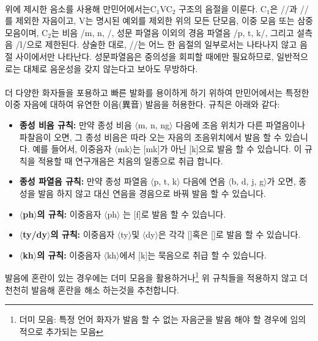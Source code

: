 \documentclass{book}
\begin{document}
    \paragraph{}
    위에 제시한 음소를 사용해 만민어에서는C$_1$VC$_2$ 구조의 음절을 이룬다. C$_1$은 //과 //를 제외한 자음이고, V는 명시된 예외를 제외한 위의 모든 단모음, 이중 모음 또는 삼중 모음이며, C$_2$는 비음 /m, n, /, 성문 파열음 이외의 경음 파열음 /p, t, k/, 그리고 설측음 /l/으로 제한된다. 상술한 대로, //는 어느 한 음절의 일부로서는 나타나지 않고 음절 사이에서만 나타난다. 성문파열음은 중의성을 회피할 때에만 필요하므로, 일반적으로는 대체로 음운성을 갖지 않는다고 보아도 무방하다.  
    \paragraph{}
    더 다양한 화자들을 포용하고 빠른 발화를 용이하게 하기 위하여 만민어에서는 특정한 이중 자음에 대하여 유연한 이음(異音) 발음을 허용한다. 규칙은 아래와 같다:
        \begin{itemize}
            \item \textbf{종성 비음 규칙:} 만약 종성 비음 $\langle{}$m, n, ng$\rangle{}$ 다음에 조음 위치가 다른 파열음이나 파찰음이 오면, 그 종성 비음은 따라 오는 자음의 조음위치에서 발음 할 수 있습니다. 예를 들어서, 이중음자 $\langle{}$mk$\rangle{}$는 [mk]가 아닌  [k]으로 발음 할 수 있습니다. 이 규칙을 적용할 때 연구개음은 치음의 일종으로 취급 합니다. 
            \item \textbf{종성 파열음 규칙:} 만약 종성 파열음  $\langle{}$p, t, k$\rangle{}$ 다음에 연음 $\langle{}$b, d, j, g$\rangle{}$가 오면, 종성을 발음 하지 않고 대신 연음을 경음으로 바꿔 발음 할 수 있습니다.  
            \item \textbf{$\langle{}$ph$\rangle{}$의 규칙:} 이중음자 $\langle{}$ph$\rangle{}$ 는 [f]로 발음 할 수 있습니다.
            \item \textbf{$\langle{}$ty/dy$\rangle{}$의 규칙: }이중음자 $\langle{}$ty$\rangle{}$및  $\langle{}$dy$\rangle{}$은 각각 [\texttctclig{}]혹은  [\textdctzlig{}]로 발음 할 수 있습니다.
            \item \textbf{$\langle{}$kh$\rangle{}$의 규칙: }이중음자 $\langle{}$kh$\rangle{}$에서 [k]는 묵음으로 취급 할 수 있습니다.
        \end{itemize}
    발음에 혼란이 있는 경우에는 더미 모음을 활용하거나\footnote{더미 모음: 특정 언어 화자가 발음 할 수 없는 자음군을 발음 해야 할 경우에 임의적으로 추가되는 모음} 위 규칙들을 적용하지 않고 더 천천히 발음해 혼란을 해소 하는것을 추천합니다. 
    \vfill\newpage
\end{document}
